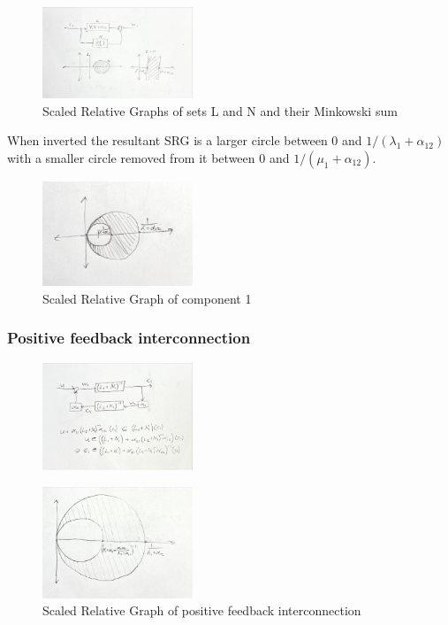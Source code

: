 \documentclass{article}
\begin{document}
\begin{figure}[H]
    \centering
    \includegraphics[width=0.4\textwidth]{figures/componentSRGs.jpg}
    \caption{Scaled Relative Graphs of sets L and N and their Minkowski sum}
\end{figure}
When inverted the resultant SRG is a larger circle between 0 and $1/(\lambda_1 + \alpha_{12})$ with a smaller circle removed from it between 0 and $1/(\mu_1 + \alpha_{12})$.
\begin{figure}[H]
    \centering
    \includegraphics[width=0.4\textwidth]{figures/compartmentSRG.jpg}
    \caption{Scaled Relative Graph of component 1}
\end{figure}

\subsubsection{Positive feedback interconnection}

\begin{figure}[H]
    \centering
    \includegraphics[width=0.4\textwidth]{figures/feedback_components.jpg}
    \caption{}
\end{figure}

\begin{figure}[H]
    \centering
    \includegraphics[width=0.4\textwidth]{figures/feedback_SRG.jpg}
    \caption{Scaled Relative Graph of positive feedback interconnection}
\end{figure}
\end{document}
